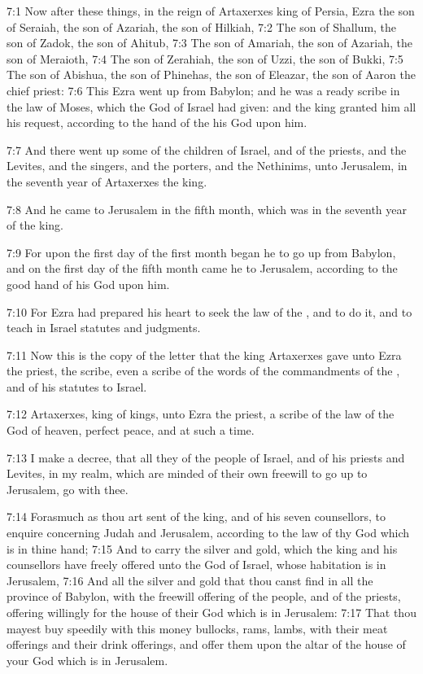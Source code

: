 7:1 Now after these things, in the reign of Artaxerxes king of Persia, Ezra the son of Seraiah, the son of Azariah, the son of Hilkiah, 7:2 The son of Shallum, the son of Zadok, the son of Ahitub, 7:3 The son of Amariah, the son of Azariah, the son of Meraioth, 7:4 The son of Zerahiah, the son of Uzzi, the son of Bukki, 7:5 The son of Abishua, the son of Phinehas, the son of Eleazar, the son of Aaron the chief priest: 7:6 This Ezra went up from Babylon; and he was a ready scribe in the law of Moses, which the \LORD God of Israel had given: and the king granted him all his request, according to the hand of the \LORD his God upon him.

7:7 And there went up some of the children of Israel, and of the priests, and the Levites, and the singers, and the porters, and the Nethinims, unto Jerusalem, in the seventh year of Artaxerxes the king.

7:8 And he came to Jerusalem in the fifth month, which was in the seventh year of the king.

7:9 For upon the first day of the first month began he to go up from Babylon, and on the first day of the fifth month came he to Jerusalem, according to the good hand of his God upon him.

7:10 For Ezra had prepared his heart to seek the law of the \LORD, and to do it, and to teach in Israel statutes and judgments.

7:11 Now this is the copy of the letter that the king Artaxerxes gave unto Ezra the priest, the scribe, even a scribe of the words of the commandments of the \LORD, and of his statutes to Israel.

7:12 Artaxerxes, king of kings, unto Ezra the priest, a scribe of the law of the God of heaven, perfect peace, and at such a time.

7:13 I make a decree, that all they of the people of Israel, and of his priests and Levites, in my realm, which are minded of their own freewill to go up to Jerusalem, go with thee.

7:14 Forasmuch as thou art sent of the king, and of his seven counsellors, to enquire concerning Judah and Jerusalem, according to the law of thy God which is in thine hand; 7:15 And to carry the silver and gold, which the king and his counsellors have freely offered unto the God of Israel, whose habitation is in Jerusalem, 7:16 And all the silver and gold that thou canst find in all the province of Babylon, with the freewill offering of the people, and of the priests, offering willingly for the house of their God which is in Jerusalem: 7:17 That thou mayest buy speedily with this money bullocks, rams, lambs, with their meat offerings and their drink offerings, and offer them upon the altar of the house of your God which is in Jerusalem.

